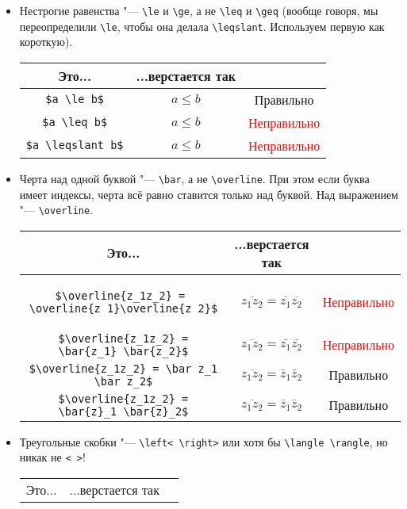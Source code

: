 \documentclass[12pt,a4paper]{book}
\renewcommand{\le}{\leqslant}
\renewcommand{\ge}{\geqslant}
\newcommand{\ok}{& \textcolor{green!60!black}{Правильно}}
\newcommand{\bad}{& \textcolor{red}{Неправильно}}
\begin{document}
\begin{enumerate}
\begin{itemize}
\begin{center}
\begin{tabular}{|c|c|c|}
\hline
\end{tabular}\end{center}
\item Нестрогие равенства "--- \verb'\le' и \verb'\ge', а не \verb'\leq' и \verb'\geq' (вообще говоря, мы переопределили \verb'\le', чтобы она делала \verb'\leqslant'. Используем первую как короткую).
\begin{center}\begin{tabular}{|c|c|c|}
\hline Это... & ...верстается так & \\
\hline \verb'$a \le b$' & $a \le b$ \ok \\
\hline \verb'$a \leq b$' & $a \leq b$ \bad \\
\hline \verb'$a \leqslant b$' & $a \leqslant b$ \bad \\
\hline
\end{tabular}\end{center}
\item Черта над одной буквой "--- \verb'\bar', а не \verb'\overline'.
При этом если буква имеет индексы, черта всё равно ставится только над буквой.
Над выражением "--- \verb'\overline'.
\begin{center}\begin{tabular}{|c|c|c|}
\hline Это... & ...верстается так & \\
\hline
\begin{minipage}{6cm}
\begin{verbatim}
$\overline{z_1z_2} = 
\overline{z_1}\overline{z_2}$
\end{verbatim}
\end{minipage}
& $\overline{z_1z_2} = \overline{z_1}\overline{z_2}$ \bad \\
\hline \verb'$\overline{z_1z_2} = \bar{z_1} \bar{z_2}$' & $\overline{z_1z_2} = \bar{z_1} \bar{z_2}$ \bad \\
\hline \verb'$\overline{z_1z_2} = \bar z_1 \bar z_2$' & $\overline{z_1z_2} = \bar z_1 \bar z_2$ \ok \\
\hline \verb'$\overline{z_1z_2} = \bar{z}_1 \bar{z}_2$' & $\overline{z_1z_2} = \bar z_1 \bar z_2$ \ok \\
\hline
\end{tabular}\end{center}
\item Треугольные скобки "--- \verb'\left< \right>' или хотя бы \verb'\langle \rangle', но никак не \verb'< >'!
\begin{center}\begin{tabular}{|c|c|c|}
\hline Это... & ...верстается так & \\

\end{tabular}
\end{center}
\end{itemize}
\end{enumerate}
\end{document}
